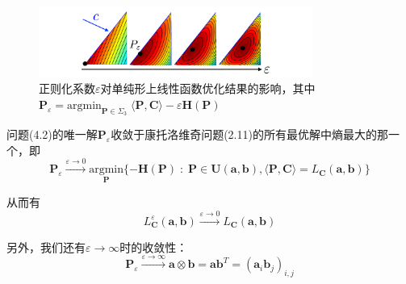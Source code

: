 \documentclass[cn,10pt,math=newtx,citestyle=gb7714-2015,bibstyle=gb7714-2015]{elegantbook}
\begin{document}
\begin{figure}[H]
    \centering
    \includegraphics[width=0.8\textwidth]{figure/fig4.1.png}
    \caption{正则化系数$\varepsilon$对单纯形上线性函数优化结果的影响，其中$\mathbf{P}_\varepsilon=\text{argmin}_{\mathbf{P} \in \Sigma_3}\;\langle \mathbf{P,C} \rangle - \varepsilon \mathbf{H(P)}$}
    \label{图4.1}
\end{figure}

\begin{proposition}
问题(4.2)的唯一解$\mathbf{P}_\varepsilon$收敛于康托洛维奇问题(2.11)的所有最优解中熵最大的那一个，即
\begin{equation}
    \label{4.3}
    \mathbf{P}_\varepsilon \overset{\varepsilon \to 0}{\longrightarrow} \text{argmin}\limits_{\mathbf{P}}\{-\mathbf{H(P)}\;:\; \mathbf{P}\in\mathbf{U(a,b)},\langle \mathbf{P,C} \rangle = L_\mathbf{C}(\mathbf{a,b})\}
\end{equation}

从而有
\begin{equation*}
    L_\mathbf{C}^\varepsilon(\mathbf{a,b}) \overset{\varepsilon \to 0}{\longrightarrow} L_\mathbf{C}(\mathbf{a,b})
\end{equation*}

另外，我们还有$\varepsilon\to\infty$时的收敛性：
\begin{equation}
    \label{4.4}
    \mathbf{P}_\varepsilon \overset{\varepsilon \to \infty}{\longrightarrow} \mathbf{a}\otimes \mathbf{b} = \mathbf{ab}^T = (\mathbf{a}_i\mathbf{b}_j)_{i,j}
\end{equation}
\end{proposition}
\end{document}

